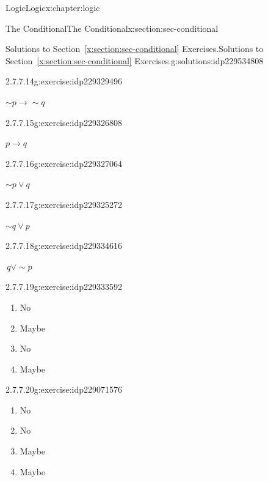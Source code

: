 \documentclass[twoside,10pt,]{book}
\newcommand{\xreffont}{\relax}
\numberwithin{equation}{section}
\newcommand{\conditional}{{p {\rightarrow} q}}
\newcommand{\inverse}{{\sim\!{p}{} {\rightarrow} \sim\!{q}{}}}
\begin{document}
\begin{chapterptx}{Logic}{}{Logic}{}{}{x:chapter:logic}
\begin{sectionptx}{The Conditional}{}{The Conditional}{}{}{x:section:sec-conditional}
\begin{solutions-subsection}{Solutions to Section~{\xreffont\ref*{x:section:sec-conditional}} Exercises.}{}{Solutions to Section~{\xreffont\ref*{x:section:sec-conditional}} Exercises.}{}{}{g:solutions:idp229534808}
\begin{exercisegroup}
\begin{divisionsolutioneg}{2.7.7.14}{}{g:exercise:idp229329496}
\par\smallskip%
\noindent\hypertarget{g:solution:idp229330008-main}{}\(\inverse\)\end{divisionsolutioneg}%
\begin{divisionsolutioneg}{2.7.7.15}{}{g:exercise:idp229326808}%
\par\smallskip%
\noindent\hypertarget{g:solution:idp229330648-main}{}\(\conditional\)\end{divisionsolutioneg}%
\begin{divisionsolutioneg}{2.7.7.16}{}{g:exercise:idp229327064}%
\par\smallskip%
\noindent\hypertarget{g:solution:idp229331800-main}{}\(\sim\!{p}{}{\vee} q \)\end{divisionsolutioneg}%
\begin{divisionsolutioneg}{2.7.7.17}{}{g:exercise:idp229325272}%
\par\smallskip%
\noindent\hypertarget{g:solution:idp229335000-main}{}\(\sim\!{q}{\vee} p\)\end{divisionsolutioneg}%
\begin{divisionsolutioneg}{2.7.7.18}{}{g:exercise:idp229334616}%
\par\smallskip%
\noindent\hypertarget{g:solution:idp229334488-main}{}\(\, q{\vee}\sim\!{p}{}\)\end{divisionsolutioneg}%
\end{exercisegroup}
\par\medskip\noindent
\begin{divisionsolution}{2.7.7.19}{}{g:exercise:idp229333592}%
\par\smallskip%
\noindent\hypertarget{g:solution:idp229336792-main}{}%
\begin{enumerate}[label=(\alph*)]
\item{}No%
\item{}Maybe%
\item{}No%
\item{}Maybe%
\end{enumerate}
\end{divisionsolution}%
\begin{divisionsolution}{2.7.7.20}{}{g:exercise:idp229071576}%
\par\smallskip%
\noindent\hypertarget{g:solution:idp229073624-main}{}%
\begin{enumerate}[label=(\alph*)]
\item{}No%
\item{}No%
\item{}Maybe%
\item{}Maybe%

\end{enumerate}
\end{divisionsolution}
\end{solutions-subsection}
\end{sectionptx}
\end{chapterptx}
\end{document}
